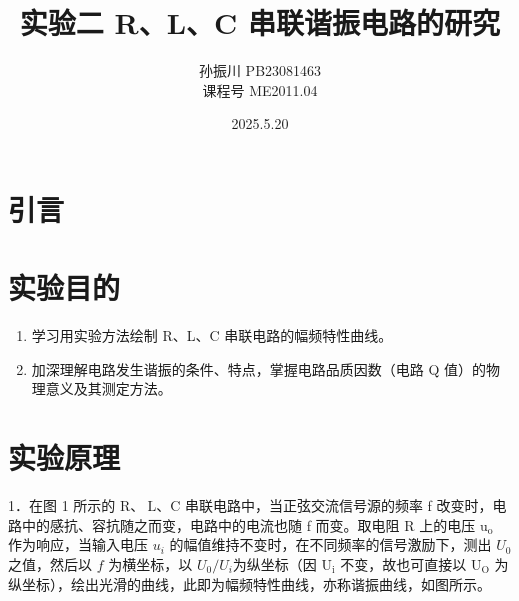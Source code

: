 \documentclass{article}
\title{\heiti\zihao{2}实验二 R、L、C 串联谐振电路的研究 }
\author{\songti  孙振川  PB23081463 \\
课程号  ME2011.04 }
\date{2025.5.20}
\begin{document}
    \maketitle
    
\begin{abstract}
    
\end{abstract}
\section{引言}

\section{实验目的}
\begin{enumerate}
    \item 学习用实验方法绘制 R、L、C 串联电路的幅频特性曲线。 
    \item 加深理解电路发生谐振的条件、特点，掌握电路品质因数（电路 Q 值）的物理意义及其测定方法。
\end{enumerate}

\section{实验原理}
1．在图 1 所示的 $\mathrm{R} 、 \mathrm{~L} 、 \mathrm{C}$ 串联电路中，当正弦交流信号源的频率 f 改变时，电路中的感抗、容抗随之而变，电路中的电流也随 f 而变。取电阻 R 上的电压 $\mathrm{u}_{\mathrm{o}}$ 作为响应，当输入电压 $u_i$ 的幅值维持不变时，在不同频率的信号激励下，测出 $U_0$ 之值，然后以 $f$ 为横坐标，以 $U_0 / U_i$为纵坐标（因 $\mathrm{U}_{\mathrm{i}}$ 不变，故也可直接以 $\mathrm{U}_{\mathrm{O}}$ 为纵坐标），绘出光滑的曲线，此即为幅频特性曲线，亦称谐振曲线，如图所示。
\end{document}
